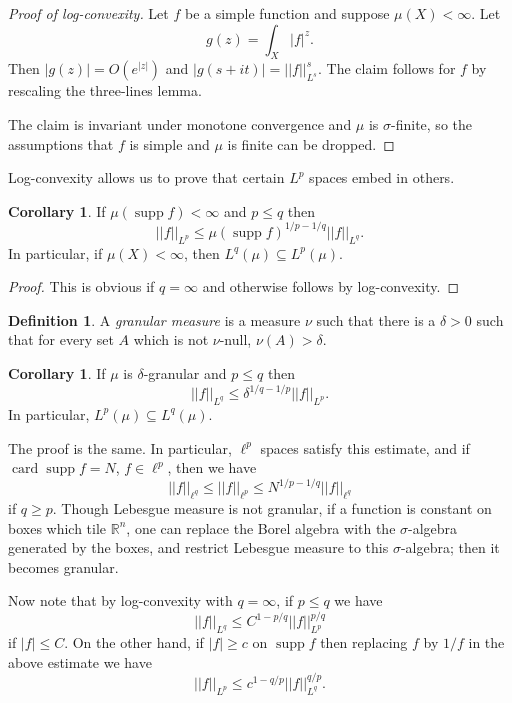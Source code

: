 \documentclass[12pt]{report}
\newcommand{\RR}{\mathbb{R}}
\newcommand{\card}{\operatorname{card}}
\newcommand{\supp}{\operatorname{supp}}
\newcommand{\dfn}[1]{\emph{#1}\index{#1}}
\theoremstyle{definition}
\newtheorem{corollary}[theorem]{Corollary}
\newtheorem{definition}[theorem]{Definition}
\begin{document}
\begin{proof}[Proof of log-convexity]
Let $f$ be a simple function and suppose $\mu(X) < \infty$. Let
$$g(z) = \int_X |f|^z.$$
Then $|g(z)| = O(e^{|z|})$ and $|g(s + it)| = ||f||_{L^s}^s$.
The claim follows for $f$ by rescaling the three-lines lemma.

The claim is invariant under monotone convergence and $\mu$ is $\sigma$-finite, so the assumptions that $f$ is simple and $\mu$ is finite can be dropped.
\end{proof}

Log-convexity allows us to prove that certain $L^p$ spaces embed in others.
\begin{corollary}
If $\mu(\supp f) < \infty$ and $p \leq q$ then
$$||f||_{L^p} \leq \mu(\supp f)^{1/p-1/q}||f||_{L^q}.$$
In particular, if $\mu(X) < \infty$, then $L^q(\mu) \subseteq L^p(\mu)$.
\end{corollary}
\begin{proof}
This is obvious if $q = \infty$ and otherwise follows by log-convexity.
\end{proof}

\begin{definition}
A \dfn{granular measure} is a measure $\nu$ such that there is a $\delta > 0$ such that for every set $A$ which is not $\nu$-null, $\nu(A) > \delta$.
\end{definition}
\begin{corollary}
If $\mu$ is $\delta$-granular and $p \leq q$ then
$$||f||_{L^q} \leq \delta^{1/q-1/p}||f||_{L^p}.$$
In particular, $L^p(\mu) \subseteq L^q(\mu)$.
\end{corollary}
The proof is the same. In particular, $\ell^p$ spaces satisfy this estimate, and if $\card \supp f = N$, $f \in \ell^p$, then we have
$$||f||_{\ell^q} \leq ||f||_{\ell^p} \leq N^{1/p-1/q}||f||_{\ell^q}$$
if $q \geq p$.
Though Lebesgue measure is not granular, if a function is constant on boxes which tile $\RR^n$, one can replace the Borel algebra with the $\sigma$-algebra generated by the boxes, and restrict Lebesgue measure to this $\sigma$-algebra; then it becomes granular.

Now note that by log-convexity with $q = \infty$, if $p \leq q$ we have
$$||f||_{L^q} \leq C^{1-p/q}||f||_{L^p}^{p/q}$$
if $|f| \leq C$.
On the other hand, if $|f| \geq c$ on $\supp f$ then replacing $f$ by $1/f$ in the above estimate we have
$$||f||_{L^p} \leq c^{1-q/p}||f||_{L^q}^{q/p}.$$
\end{document}
